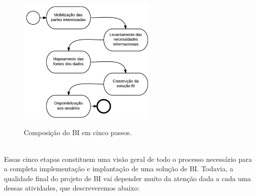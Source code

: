 \begin{figure}[H]
	\vspace*{0,2cm}
    \centering
    \caption{Composi\c{c}\~{a}o do BI em cinco passos.}
    \includegraphics[width=0.6\textwidth]{./04-figuras/figura-04}
    \label{fig:ilustfig04}
\end{figure}
\vspace*{-0,9cm}
{\raggedright {}}\\


Essas cinco etapas constituem uma vis\~{a}o geral de todo o processo necess\'{a}rio para a completa implementa\c{c}\~{a}o e implanta\c{c}\~{a}o de uma solu\c{c}\~{a}o de BI. Todavia, a qualidade final do projeto de BI vai depender muito da aten\c{c}\~{a}o dada a cada uma dessas atividades, que descreveremos abaixo:

